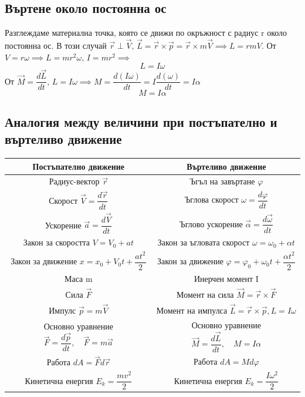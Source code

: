 \documentclass[fleqn, 12pt]{article}
\theoremstyle{definition}
\begin{document}
\subsection{Въртене около постоянна ос}
Разглеждаме материална точка, която се движи по окръжност с радиус r около постоянна ос. В този случай  $\vec{r} \perp \vec{V}, \, \vec{L} = \vec{r} \times \vec{p} = \vec{r} \times m\vec{V} \implies L = rmV $. От $V = r \omega \implies L =mr^2  \omega, \, I = mr^2 \implies $ 
$$L = I\omega$$
От $\vec{M} = \dfrac{d \vec{L}}{dt},\, L = I\omega \implies  M = \dfrac{d(I\omega)}{dt} = I \dfrac{d(\omega)}{dt} = I\alpha$
$$M = I\alpha $$

\subsection{Аналогия между величини при постъпателно и въртеливо движение}

\begin{center}
\begin{tabular}{ |c|c| } 
 \hline
 \textbf{Постъпателно движение} & \textbf{Въртеливо движение} \\ 
\hline
Радиус-вектор $\vec{r} $ & Ъгъл на завъртане $\varphi$ \\ 
\hline
 Скорост $\vec{V} = \dfrac{d \vec{r}}{dt}$ & Ъглова скорост  $\omega = \dfrac{d\varphi}{dt}$\\ 
 \hline
 Ускорение $\vec{a} = \dfrac{d \vec{V}}{dt}$ & Ъглово ускорение  $\vec{\alpha} = \dfrac{d\vec{\omega}}{dt}$\\ 
 \hline
 Закон за скоростта $V = V_0 + at$ & Закон за ъгловата скорост $\omega = \omega_0 + \alpha t$ \\
\hline
Закон за движение $x = x_0 + V_0t + \dfrac{at^2}{2}$ & Закон за движение  $\varphi = \varphi_0 + \omega_0t + \dfrac{\alpha t^2}{2}$  \\
\hline
Маса m & Инерчен момент I\\
\hline
Сила $\vec{F}$ & Момент на сила $\vec{M} = \vec{r} \times \vec{F} $ \\
\hline
Импулс $\vec{p} = m\vec{V}$ & Момент на импулса $\vec{L} = \vec{r} \times \vec{p}, L = I\omega $\\
\hline
Основно уравнение $ \vec{F} = \dfrac{d \vec{p}}{dt}, \quad  \vec{F} = m\vec{a} $ & Основно уравнение $\vec{M} = \dfrac{d \vec{L}}{dt}, \quad  M = I\alpha$ \\
\hline
Работа $dA = \vec{F} d\vec{r}$ & Работа $dA = Md\varphi$ \\
\hline
Кинетична енергия $E_k = \dfrac{mv^2}{2}$ &  Кинетична енергия $E_k = \dfrac{I \omega^2}{2}$\\
\hline
\end{tabular}
\end{center}
\end{document}
